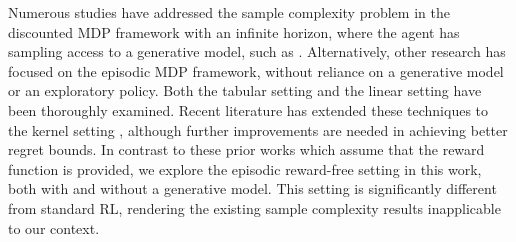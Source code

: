 Numerous studies have addressed the sample complexity problem in the discounted MDP framework with an infinite horizon, where the agent has sampling access to a generative model, such as \citep{kearns1998finite,gheshlaghi2013minimax,agarwal2020model}. Alternatively, other research has focused on the episodic MDP framework, without reliance on a generative model or an exploratory policy. Both the tabular setting \citep{jin2018q,auer2008near,bartlett2012regal} and the linear setting \citep{jin2020provably,yao2014pseudo,russo2019worst,zanette2020frequentist,neu2020unifying} have been thoroughly examined. Recent literature has extended these techniques to the kernel setting \citep{yang2020provably,yang2020reinforcement,chowdhury2019online,domingues2021kernel,vakili2024kernelized}, although further improvements are needed in achieving better regret bounds. In contrast to these prior works which assume that the reward function is provided, we explore the episodic reward-free setting in this work, both with and without a generative model. This setting is significantly different from standard RL, rendering the existing sample complexity results inapplicable to our context. 

